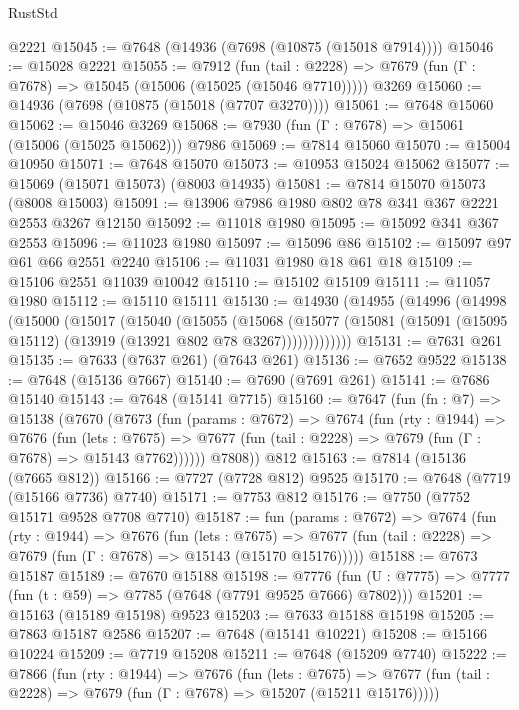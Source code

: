 \begin{lexlean}{RustStd}
\begin{coremodule}
{\begin{coremodule}
{{{{{{{{{{{{{{{{{{{{{{{{{{{{{{{{{{{{{{{{{{{{{{{{{{{{{    @2221
@15045 := @7648 (@14936 (@7698 (@10875 (@15018 @7914))))
@15046 := @15028 @2221
@15055 := @7912
    (fun (tail : @2228) => @7679 (fun (Γ : @7678) => @15045 (@15006 (@15025 (@15046 @7710)))))
    @3269
@15060 := @14936 (@7698 (@10875 (@15018 (@7707 @3270))))
@15061 := @7648 @15060
@15062 := @15046 @3269
@15068 := @7930 (fun (Γ : @7678) => @15061 (@15006 (@15025 @15062))) @7986
@15069 := @7814 @15060
@15070 := @15004 @10950
@15071 := @7648 @15070
@15073 := @10953 @15024 @15062
@15077 := @15069 (@15071 @15073) (@8003 @14935)
@15081 := @7814 @15070 @15073 (@8008 @15003)
@15091 := @13906 @7986 @1980 @802 @78 @341 @367 @2221 @2553 @3267 @12150
@15092 := @11018 @1980
@15095 := @15092 @341 @367 @2553
@15096 := @11023 @1980
@15097 := @15096 @86
@15102 := @15097 @97 @61 @66 @2551 @2240
@15106 := @11031 @1980 @18 @61 @18
@15109 := @15106 @2551 @11039 @10042
@15110 := @15102 @15109
@15111 := @11057 @1980
@15112 := @15110 @15111
@15130 := @14930
    (@14955
      (@14996
        (@14998
          (@15000
            (@15017
              (@15040
                (@15055
                  (@15068
                    (@15077
                      (@15081 (@15091 (@15095 @15112) (@13919 (@13921 @802 @78 @3267)))))))))))))
@15131 := @7631 @261
@15135 := @7633 (@7637 @261) (@7643 @261)
@15136 := @7652 @9522
@15138 := @7648 (@15136 @7667)
@15140 := @7690 (@7691 @261)
@15141 := @7686 @15140
@15143 := @7648 (@15141 @7715)
@15160 := @7647
    (fun (fn : @7) =>
    @15138
      (@7670
        (@7673
          (fun (params : @7672) =>
          @7674
            (fun (rty : @1944) =>
            @7676
              (fun (lets : @7675) =>
              @7677 (fun (tail : @2228) => @7679 (fun (Γ : @7678) => @15143 @7762))))))
        @7808))
    @812
@15163 := @7814 (@15136 (@7665 @812))
@15166 := @7727 (@7728 @812) @9525
@15170 := @7648 (@7719 (@15166 @7736) @7740)
@15171 := @7753 @812
@15176 := @7750 (@7752 @15171 @9528 @7708 @7710)
@15187 := fun (params : @7672) =>
  @7674
    (fun (rty : @1944) =>
    @7676
      (fun (lets : @7675) =>
      @7677 (fun (tail : @2228) => @7679 (fun (Γ : @7678) => @15143 (@15170 @15176)))))
@15188 := @7673 @15187
@15189 := @7670 @15188
@15198 := @7776
    (fun (U : @7775) => @7777 (fun (t : @59) => @7785 (@7648 (@7791 @9525 @7666) @7802)))
@15201 := @15163 (@15189 @15198) @9523
@15203 := @7633 @15188 @15198
@15205 := @7863 @15187 @2586
@15207 := @7648 (@15141 @10221)
@15208 := @15166 @10224
@15209 := @7719 @15208
@15211 := @7648 (@15209 @7740)
@15222 := @7866
    (fun (rty : @1944) =>
    @7676
      (fun (lets : @7675) =>
      @7677 (fun (tail : @2228) => @7679 (fun (Γ : @7678) => @15207 (@15211 @15176)))))
}}}}}}}}}}}}}}}}}}}}}}}}}}}}}}}}}}}}}}}}}}}}}}}}}}}}}
\end{coremodule}}
\end{coremodule}
\end{lexlean}
